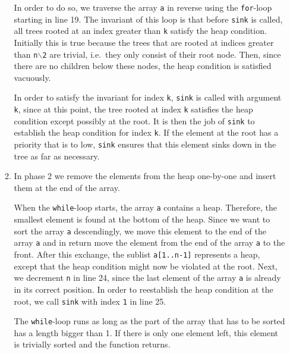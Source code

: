 \begin{enumerate}
\begin{enumerate}
            In order to do so, we traverse the array \texttt{a} in reverse using the
            \texttt{for}-loop starting in line 19.  The invariant of this loop is that before
            \texttt{sink} is called, all trees rooted at an index greater than
            \texttt{k} satisfy the heap condition.  Initially this is true because the trees that
            are rooted at indices greater than \texttt{n$\backslash$2} are trivial, i.e.~they only
            consist of their root node.  Then, since there are no children below these nodes, the heap
            condition is satisfied vacuously. 
            
            In order to satisfy the invariant for index \texttt{k}, \texttt{sink} is called with
            argument \texttt{k},  since at this point, the tree rooted at index \texttt{k} satisfies
            the heap condition except possibly at the root.  It is then the job of \texttt{sink} to
            establish the heap condition for index \texttt{k}.  If the element at the root has a
            priority that is to low, \texttt{sink} ensures that this element sinks down in the tree
            as far as necessary.
      \item In phase 2 we remove the elements from the heap one-by-one and insert them at the end of
            the array.

            When the \texttt{while}-loop starts, the array \texttt{a} contains a heap.  Therefore,
            the smallest element is found at the bottom of the heap.  Since we want to sort the
            array \texttt{a} descendingly, we move this element to the end of the array \texttt{a} and in
            return move the element from the end of the array \texttt{a} to the front.
            After this exchange, the sublist \texttt{a[1..n-1]} represents a heap, except that the
            heap condition might now be violated at the root.  Next, we decrement \texttt{n} in line 24, since the
            last element of the array \texttt{a} is already in its correct position.  
            In order to reestablish the heap condition at the root, we call \texttt{sink} with index
            \texttt{1} in line 25.

            The \texttt{while}-loop runs as long as the part of the array that has to be sorted has
            a length bigger than 1.  If there is only one element left, this element is trivially
            sorted and the function returns.
      \end{enumerate}
\end{enumerate}

